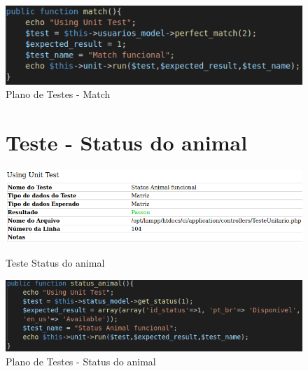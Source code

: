 \begin{apendicesenv}
\begin{figure}[htb]
    \centering
    \caption{\label{fig_timeline}Plano de Testes - Match}
	\includegraphics[width=1\textwidth]{imagens/cod_teste_match.png}
\end{figure}

\begin{figure}[!htbp]
\begin{flushleft}
    \section{Teste - Status do animal}
\end{flushleft}
    \centering
    \caption{Teste Status do animal}
    \includegraphics[width=1\textwidth,pagecommand=\chapter{}]{imagens/teste_status.png}
    \label{teste-status}
\end{figure}

\begin{figure}[htb]
    \centering
    \caption{\label{fig_timeline}Plano de Testes - Status do animal}
	\includegraphics[width=1\textwidth]{imagens/cod_teste_status.png}
\end{figure}

\begin{figure}[!htbp]
\begin{flushleft}

\end{flushleft}
\end{figure}
\end{apendicesenv}
